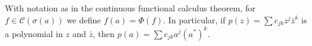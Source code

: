 With notation as in the continuous functional calculus theorem, for $f \in \mathcal{C}(\sigma(a))$ we define $f(a) = \Phi(f)$. In particular, if $p(z) = \sum c_{jk} z^j \bar{z}^k$ is a polynomial in $z$ and $\bar{z}$, then $p(a) = \sum c_{jk} a^j (a^*)^k$.
